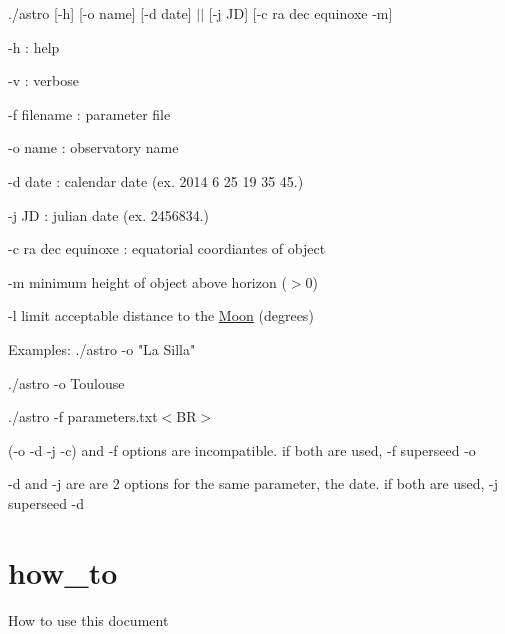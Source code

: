  ./astro \mbox{[}-\/h\mbox{]} \mbox{[}-\/o name\mbox{]} \mbox{[}-\/d date\mbox{]} $|$$|$ \mbox{[}-\/j J\-D\mbox{]} \mbox{[}-\/c ra dec equinoxe -\/m\mbox{]}\par
 -\/h \-: help\par
 -\/v \-: verbose\par
 -\/f filename \-: parameter file\par
 -\/o name \-: observatory name\par
 -\/d date \-: calendar date (ex. 2014 6 25 19 35 45.)\par
 -\/j J\-D \-: julian date (ex. 2456834.)\par
 -\/c ra dec equinoxe \-: equatorial coordiantes of object\par
 -\/m minimum height of object above horizon ($>$0)\par
 -\/l limit acceptable distance to the \hyperlink{class_moon}{Moon} (degrees)\par
 \par
 Examples\-: ./astro -\/o "La Silla"\par
 ./astro -\/o Toulouse\par
 ./astro -\/f parameters.\-txt$<$\-B\-R$>$ \par
 (-\/o -\/d -\/j -\/c) and -\/f options are incompatible. if both are used, -\/f superseed -\/o\par
 -\/d and -\/j are are 2 options for the same parameter, the date. if both are used, -\/j superseed -\/d\par
\hypertarget{index_how_to}{}\section{how\-\_\-to}\label{index_how_to}
How to use this document 